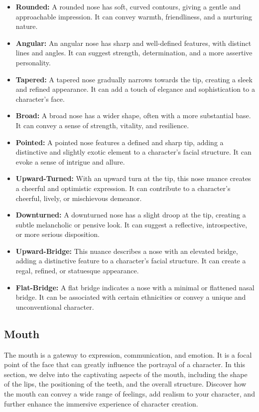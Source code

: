 \begin{itemize}
    \item \textbf{Rounded:} A rounded nose has soft, curved contours, giving a gentle and approachable impression. It can convey warmth, friendliness, and a nurturing nature.
    \item \textbf{Angular:} An angular nose has sharp and well-defined features, with distinct lines and angles. It can suggest strength, determination, and a more assertive personality.
    \item \textbf{Tapered:} A tapered nose gradually narrows towards the tip, creating a sleek and refined appearance. It can add a touch of elegance and sophistication to a character's face.
    \item \textbf{Broad:} A broad nose has a wider shape, often with a more substantial base. It can convey a sense of strength, vitality, and resilience.
    \item \textbf{Pointed:} A pointed nose features a defined and sharp tip, adding a distinctive and slightly exotic element to a character's facial structure. It can evoke a sense of intrigue and allure.
    \item \textbf{Upward-Turned:} With an upward turn at the tip, this nose nuance creates a cheerful and optimistic expression. It can contribute to a character's cheerful, lively, or mischievous demeanor.
    \item \textbf{Downturned:} A downturned nose has a slight droop at the tip, creating a subtle melancholic or pensive look. It can suggest a reflective, introspective, or more serious disposition.
    \item \textbf{Upward-Bridge:} This nuance describes a nose with an elevated bridge, adding a distinctive feature to a character's facial structure. It can create a regal, refined, or statuesque appearance.
    \item \textbf{Flat-Bridge:} A flat bridge indicates a nose with a minimal or flattened nasal bridge. It can be associated with certain ethnicities or convey a unique and unconventional character.
\end{itemize}

\subsection{\textbf{Mouth}}

The mouth is a gateway to expression, communication, and emotion. It is a focal point of the face that can greatly influence the portrayal of a character. In this section, we delve into the captivating aspects of the mouth, including the shape of the lips, the positioning of the teeth, and the overall structure. Discover how the mouth can convey a wide range of feelings, add realism to your character, and further enhance the immersive experience of character creation.

